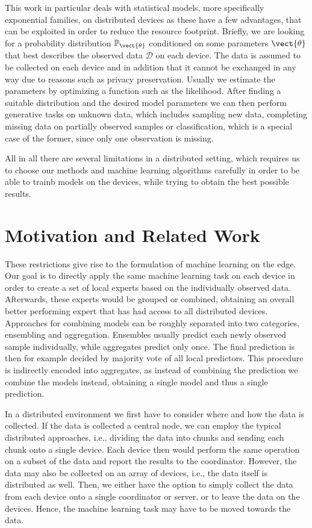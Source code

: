 This work in particular deals with statistical models, more specifically exponential families, on distributed devices as these have a few advantages, that can be exploited in order to reduce the resource footprint.
Briefly, we are looking for a probability distribution $\mathbb{P}_{\vect{\theta}}$ conditioned on some parameters $\vect{\theta}$ that best describes the observed data $\mathcal{D}$ on each device.
The data is assumed to be collected on each device and in addition that it cannot be exchanged in any way due to reasons such as privacy preservation.
Usually we estimate the parameters by optimizing a function such as the likelihood.
After finding a suitable distribution and the desired model parameters we can then perform generative tasks on unknown data, which includes sampling new data, completing missing data on partially observed samples or classification, which is a special case of the former, since only one observation is missing.

All in all there are several limitations in a distributed setting, which requires us to choose our methods and machine learning algorithms carefully in order to be able to trainb models on the devices, while trying to obtain the best possible results.

\section{Motivation and Related Work}

These restrictions give rise to the formulation of machine learning on the edge. 
Our goal is to directly apply the same machine learning task on each device in order to create a set of local experts based on the individually observed data.
Afterwards, these experts would be grouped or combined, obtaining an overall better performing expert 
that has had access to all distributed devices.
Approaches for combining models can be roughly separated into two categories, ensembling and aggregation. 
Ensembles usually predict each newly observed sample individually, while aggregates predict only once.
The final prediction is then for example decided by majority vote of all local predictors.
This procedure is indirectly encoded into aggregates, as instead of combining the prediction we combine the models instead, obtaining a single model and thus a single prediction.

In a distributed environment we first have to consider where and how the data is collected. 
If the data is collected a central node, we can employ the typical distributed approaches, i.e., dividing the data into chunks and sending each chunk onto a single device.
Each device then would perform the same operation on a subset of the data and report the results to the coordinator.
However, the data may also be collected on an array of devices, i.e., the data itself is distributed as well.
Then, we either have the option to simply collect the data from each device onto a single coordinator or server, or to leave the data on the devices. 
Hence, the machine learning task may have to be moved towards the data.

